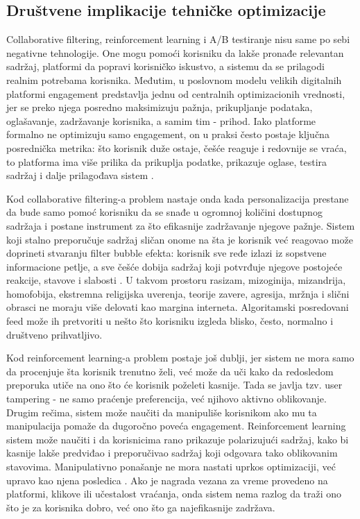 \subsection{Društvene implikacije tehničke optimizacije}

Collaborative filtering, reinforcement learning i A/B testiranje nisu same po sebi negativne tehnologije. One mogu pomoći korisniku da lakše pronađe relevantan sadržaj, platformi da popravi korisničko iskustvo, a sistemu da se prilagodi realnim potrebama korisnika. Međutim, u poslovnom modelu velikih digitalnih platformi engagement predstavlja jednu od centralnih optimizacionih vrednosti, jer se preko njega posredno maksimizuju pažnja, prikupljanje podataka, oglašavanje, zadržavanje korisnika, a samim tim - prihod. Iako platforme formalno ne optimizuju samo engagement, on u praksi često postaje ključna posrednička metrika: što korisnik duže ostaje, češće reaguje i redovnije se vraća, to platforma ima više prilika da prikuplja podatke, prikazuje oglase, testira sadržaj i dalje prilagođava sistem \cite{gonzalez2024attention}.

Kod collaborative filtering-a problem nastaje onda kada personalizacija prestane da bude samo pomoć korisniku da se snađe u ogromnoj količini dostupnog sadržaja i postane instrument za što efikasnije zadržavanje njegove pažnje. Sistem koji stalno preporučuje sadržaj sličan onome na šta je korisnik već reagovao može doprineti stvaranju filter bubble efekta: korisnik sve ređe izlazi iz sopstvene informacione petlje, a sve češće dobija sadržaj koji potvrđuje njegove postojeće reakcije, stavove i slabosti \cite{nguyen2014filterbubble}. U takvom prostoru rasizam, mizoginija, mizandrija, homofobija, ekstremna religijska uverenja, teorije zavere, agresija, mržnja i slični obrasci ne moraju više delovati kao margina interneta. Algoritamski posredovani feed može ih pretvoriti u nešto što korisniku izgleda blisko, često, normalno i društveno prihvatljivo.

Kod reinforcement learning-a problem postaje još dublji, jer sistem ne mora samo da procenjuje šta korisnik trenutno želi, već može da uči kako da redosledom preporuka utiče na ono što će korisnik poželeti kasnije. Tada se javlja tzv. user tampering - ne samo praćenje preferencija, već njihovo aktivno oblikovanje. Drugim rečima, sistem može naučiti da manipuliše korisnikom ako mu ta manipulacija pomaže da dugoročno poveća engagement. Reinforcement learning sistem može naučiti i da korisnicima rano prikazuje polarizujući sadržaj, kako bi kasnije lakše predviđao i preporučivao sadržaj koji odgovara tako oblikovanim stavovima. Manipulativno ponašanje ne mora nastati uprkos optimizaciji, već upravo kao njena posledica \cite{kasirzadeh2021user}. Ako je nagrada vezana za vreme provedeno na platformi, klikove ili učestalost vraćanja, onda sistem nema razlog da traži ono što je za korisnika dobro, već ono što ga najefikasnije zadržava.

